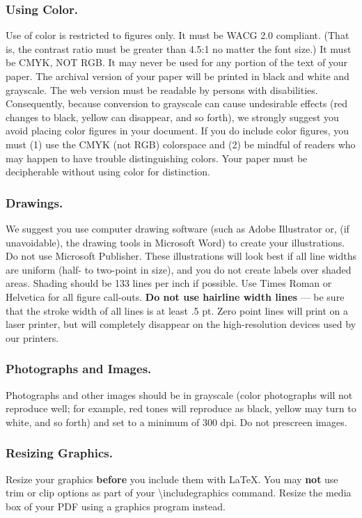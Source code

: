 \subsubsection{Using Color.}
Use of color is restricted to figures only. It must be WACG 2.0 compliant. (That is, the contrast ratio must be greater than 4.5:1 no matter the font size.) It must be CMYK, NOT RGB. It may never be used for any portion of the text of your paper. The archival version of your paper will be printed in black and white and grayscale. The web version must be readable by persons with disabilities. Consequently, because conversion to grayscale can cause undesirable effects (red changes to black, yellow can disappear, and so forth), we strongly suggest you avoid placing color figures in your document. If you do include color figures, you must (1) use the CMYK (not RGB) colorspace and (2) be mindful of readers who may happen to have trouble distinguishing colors. Your paper must be decipherable without using color for distinction.

\subsubsection{Drawings.}
We suggest you use computer drawing software (such as Adobe Illustrator or, (if unavoidable), the drawing tools in Microsoft Word) to create your illustrations. Do not use Microsoft Publisher. These illustrations will look best if all line widths are uniform (half- to two-point in size), and you do not create labels over shaded areas. Shading should be 133 lines per inch if possible. Use Times Roman or Helvetica for all figure call-outs. \textbf{Do not use hairline width lines} --- be sure that the stroke width of all lines is at least .5 pt. Zero point lines will print on a laser printer, but will completely disappear on the high-resolution devices used by our printers.

\subsubsection{Photographs and Images.}
Photographs and other images should be in grayscale (color photographs will not reproduce well; for example, red tones will reproduce as black, yellow may turn to white, and so forth) and set to a minimum of 300 dpi. Do not prescreen images.

\subsubsection{Resizing Graphics.}
Resize your graphics \textbf{before} you include them with LaTeX. You may \textbf{not} use trim or clip options as part of your \textbackslash includegraphics command. Resize the media box of your PDF using a graphics program instead.

